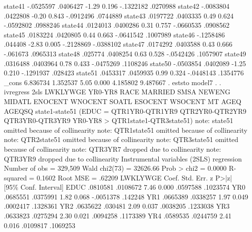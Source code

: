      state41 {\VBAR}  -.0525597   .0406427    -1.29   0.196    -.1322182    .0270988
     state42 {\VBAR}  -.0083804   .0422808    -0.20   0.843    -.0912496    .0744889
     state43 {\VBAR}   .0197722   .0403335     0.49   0.624    -.0592802    .0988246
     state44 {\VBAR}   .0124013   .0400286     0.31   0.757    -.0660535    .0908562
     state45 {\VBAR}   .0183224   .0420805     0.44   0.663    -.0641542    .1007989
     state46 {\VBAR}  -.1258486    .044408    -2.83   0.005    -.2128869   -.0388102
     state47 {\VBAR}   .0174292   .0403588     0.43   0.666     -.061673    .0965313
     state48 {\VBAR}    .025774   .0408254     0.63   0.528    -.0542426    .1057907
     state49 {\VBAR}   .0316488   .0403964     0.78   0.433    -.0475269    .1108246
     state50 {\VBAR}  -.0503854   .0402089    -1.25   0.210    -.1291937     .028423
     state51 {\VBAR}   .0453317   .0459935     0.99   0.324    -.0448143    .1354776
       _cons {\VBAR}   6.836734   1.352537     5.05   0.000     4.185802    9.487667
{\smallskip}
. eststo model7
{\smallskip}
. 
. ivregress 2sls LWKLYWGE YR0-YR8 RACE MARRIED SMSA NEWENG MIDATL ENOCENT WNOCENT SOATL ESOCENT WSOCENT MT AGEQ AGEQSQ state1-state51 (EDUC = QTR1YR0-QTR1YR9 QTR2YR0-QTR2YR9 QTR3YR0-QTR3YR9 YR0-YR8 
> QTR1state1-QTR3state51)
note: state51 omitted because of collinearity
note: QTR1state51 omitted because of collinearity
note: QTR2state51 omitted because of collinearity
note: QTR3state51 omitted because of collinearity
note: QTR3YR7 dropped due to collinearity
note: QTR3YR9 dropped due to collinearity
{\smallskip}
Instrumental variables (2SLS) regression          Number of obs   =    329,509
                                                  Wald chi2(73)   =   32626.66
                                                  Prob > chi2     =     0.0000
                                                  R-squared       =     0.1602
                                                  Root MSE        =     .62209
{\smallskip}
    LWKLYWGE {\VBAR}      Coef.   Std. Err.      z    P>|z|     [95\% Conf. Interval]
        EDUC {\VBAR}   .0810581   .0108672     7.46   0.000     .0597588    .1023574
         YR0 {\VBAR}   .0685551   .0375991     1.82   0.068    -.0051378     .142248
         YR1 {\VBAR}   .0665389   .0338257     1.97   0.049     .0002417    .1328361
         YR2 {\VBAR}   .0635622    .030481     2.09   0.037     .0038205    .1233038
         YR3 {\VBAR}   .0633823   .0275294     2.30   0.021     .0094258    .1173389
         YR4 {\VBAR}   .0589535   .0244759     2.41   0.016     .0109817    .1069253

